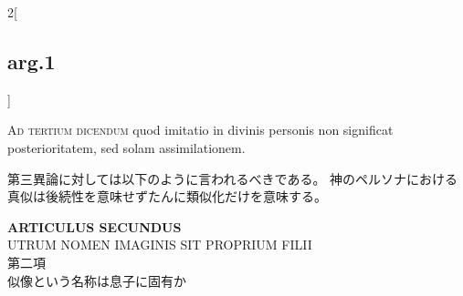 \documentclass[paper=a4paper,fontsize=10pt,jafontsize=9pt,titlepage]{jlreq}
\begin{document}
\begin{paracol}{2}[\subsection{arg.1}]
\switchcolumn*[\subsection{ad.3}]

{\scshape Ad tertium dicendum} quod imitatio in divinis personis non significat
posterioritatem, sed solam assimilationem.

\switchcolumn

第三異論に対しては以下のように言われるべきである。
神のペルソナにおける真似は後続性を意味せずたんに類似化だけを意味する。

\end{paracol}
\newpage


\begin{center}
{\Large {\bfseries ARTICULUS SECUNDUS}}\\
{\large UTRUM NOMEN IMAGINIS SIT PROPRIUM FILII}\\
{\Large 第二項\\似像という名称は息子に固有か}
\end{center}


{}
\setcounter{section}{2}
\setcounter{subsection}{0}
\end{document}
